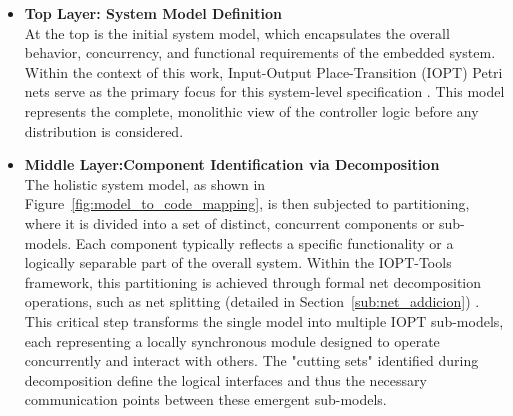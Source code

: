 \begin{itemize}
    \item \textbf{Top Layer: System Model Definition} \\
    At the top is the initial system model, which encapsulates the overall behavior, concurrency, and functional requirements of the embedded system. Within the context of this work, Input-Output Place-Transition (IOPT) Petri nets serve as the primary focus for this system-level specification \cite{iopttools, RefiningIOPT}. This model represents the complete, monolithic view of the controller logic before any distribution is considered.

    \item \textbf{Middle Layer:Component Identification via Decomposition} \\
    The holistic system model, as shown in Figure~\ref{fig:model_to_code_mapping}, is then subjected to partitioning, where it is divided into a set of distinct, concurrent components or sub-models. Each component typically reflects a specific functionality or a logically separable part of the overall system. Within the IOPT-Tools framework, this partitioning is achieved through formal net decomposition operations, such as net splitting (detailed in Section~\ref{sub:net_addicion}) \cite{Barrosadd, apresentacao}. This critical step transforms the single model into multiple IOPT sub-models, each representing a locally synchronous module designed to operate concurrently and interact with others. The "cutting sets" identified during decomposition define the logical interfaces and thus the necessary communication points between these emergent sub-models.


\end{itemize}
